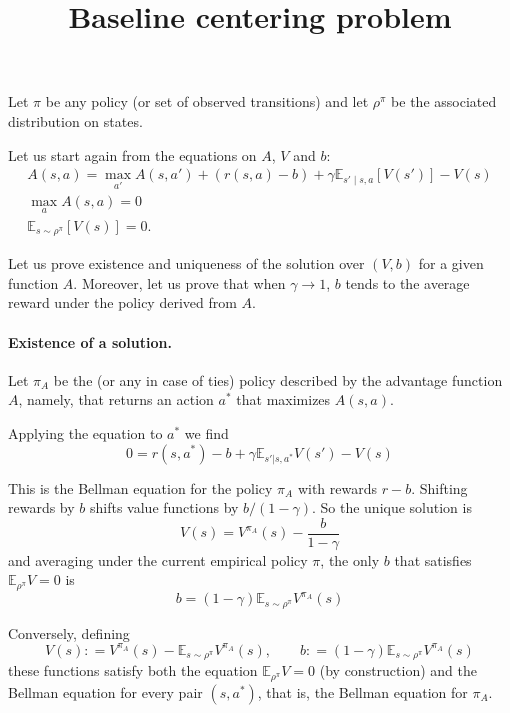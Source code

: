 \documentclass[11pt]{article}
\title{Baseline centering problem}
\newcommand{\E}{\mathbb{E}}
\newcommand{\deq}{\mathrel{\mathop{:}}=}
\begin{document}
\maketitle

Let $\pi$ be any policy (or set of observed transitions) and let
$\rho^\pi$ be the associated distribution on states.

Let us start again from  the equations on $A$, $V$ and $b$:
\begin{gather}
	A(s, a) = \max\limits_{a'} A(s, a') + 
		(r(s, a) - b)
		 + 
		\gamma \E_{s'\mid s,a}\left[
			V(s')
		\right] - V(s)
	\\
	\max\limits_{a} A(s, a) = 0\\
	\E_{s\sim \rho^\pi}\left[V(s)\right] = 0
	.
\end{gather}

Let us prove existence and uniqueness of the solution over $(V,b)$ for a
given function $A$. Moreover, let us prove that when $\gamma\to 1$, $b$
tends to the average reward under the policy derived from $A$.

\paragraph{Existence of a solution.}

Let $\pi_A$ be the (or any in case of ties) policy described by the advantage function $A$,
namely, that returns an action $a^\ast$ that maximizes $A(s,a)$.

Applying the equation to $a^\ast$ we find
\begin{equation}
\label{eq:optbellman}
0=r(s,a^\ast)-b+\gamma \E_{s'|s,a^\ast} V(s')-V(s)
\end{equation}

This is the Bellman equation for the policy $\pi_A$ with rewards $r-b$.
Shifting rewards by $b$ shifts value functions by $b/(1-\gamma)$. So
the unique solution is
\begin{equation}
V(s)=V^{\pi_A}(s)-\frac{b}{1-\gamma}
\end{equation}
and averaging under the current empirical policy $\pi$, the only $b$ that
satisfies
$\E_{\rho^\pi} V=0$ is
\begin{equation}
b=(1-\gamma)\E_{s\sim \rho^\pi} V^{\pi_A}(s)
\end{equation}

Conversely, defining 
\begin{equation}
V(s)\deq V^{\pi_A}(s)-\E_{s\sim \rho^\pi} V^{\pi_A}(s),\qquad
b\deq (1-\gamma)\E_{s\sim \rho^\pi} V^{\pi_A}(s)
\end{equation}
these functions satisfy
both the equation $\E_{\rho^\pi} V=0$ (by construction) and the Bellman equation for
every pair $(s,a^\ast)$, that is, the Bellman equation for $\pi_A$.
\end{document}
